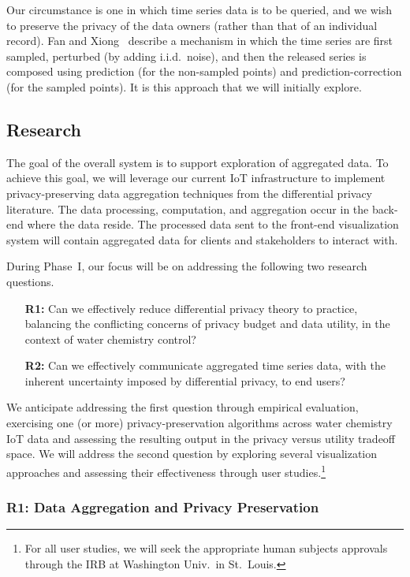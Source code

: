 Our circumstance is one in which time series data is to be queried, and we
wish to preserve the privacy of the data owners (rather than that of
an individual record).
Fan and Xiong~\cite{fx12,fx14} describe a mechanism in which the time
series are first sampled, perturbed (by adding i.i.d.~noise), and then
the released series is composed using prediction (for the non-sampled
points) and prediction-correction (for the sampled points).  It is this
approach that we will initially explore.

\subsection{Research}

The goal of the overall system is to support exploration of aggregated data. 
To achieve this goal, we will leverage our current IoT infrastructure
to implement privacy-preserving data aggregation techniques from the
differential privacy literature.
The data processing, computation, and aggregation occur in the
back-end where the data reside.
The processed data sent to the front-end visualization system will
contain aggregated data for clients and stakeholders to interact with.

During Phase~I, our focus will be on addressing the following two
research questions.
\begin{enumerate}
\item[\textbf{R1:}] Can we effectively reduce differential privacy theory to practice,
balancing the conflicting concerns of privacy budget and data utility, in
the context of water chemistry control?
\item[\textbf{R2:}] Can we effectively communicate aggregated time series data,
with the inherent uncertainty imposed by differential privacy, to end users?
\end{enumerate}

We anticipate addressing the first question through empirical evaluation,
exercising one (or more) privacy-preservation algorithms across water
chemistry IoT data and assessing the resulting output in the privacy
versus utility tradeoff space.  We will address the second question by
exploring several visualization approaches and assessing their effectiveness
through user studies.\footnote{For all user studies, we will seek the
appropriate human subjects approvals through the IRB at Washington
Univ.~in St.~Louis.}

\subsubsection{R1: Data Aggregation and Privacy Preservation}

